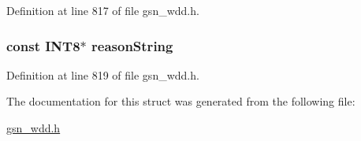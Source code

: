 Definition at line 817 of file gsn\_\-wdd.h.

\hypertarget{a00274_a3fee925dbc50dacdd4663217479ca4a7}{
\subsubsection[{reasonString}]{\setlength{\rightskip}{0pt plus 5cm}const {\bf INT8}$\ast$ {\bf reasonString}}}
\label{a00274_a3fee925dbc50dacdd4663217479ca4a7}


Definition at line 819 of file gsn\_\-wdd.h.



The documentation for this struct was generated from the following file:\begin{DoxyCompactItemize}
\item 
\hyperlink{a00603}{gsn\_\-wdd.h}\end{DoxyCompactItemize}
